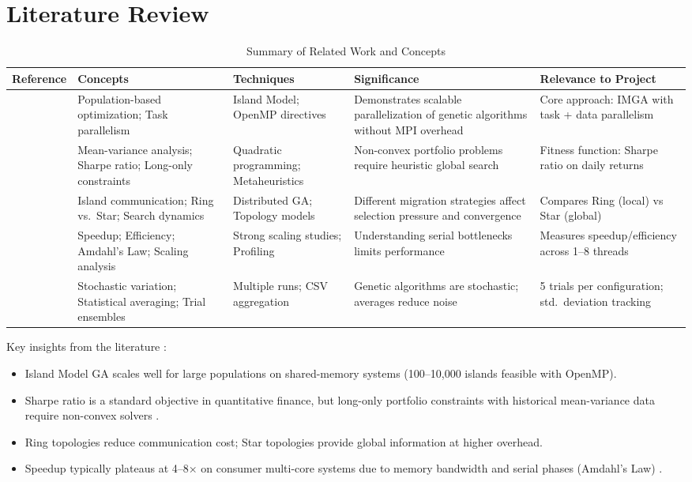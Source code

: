 \documentclass[12pt,a4paper]{article}
\begin{document}
\newpage
\section{Literature Review}

\begin{longtable}[htp]{|p{1.8cm}|p{2.2cm}|p{2.2cm}|p{2.8cm}|p{3cm}|}
\caption{Summary of Related Work and Concepts}
\label{Table:LitReview}
\hline \textbf{Reference} & \textbf{Concepts} & \textbf{Techniques} & \textbf{Significance} & \textbf{Relevance to Project} \\
\hline \multirow{2}{*}{\cite{alba2005}} & Population-based optimization; Task parallelism & Island Model; OpenMP directives & Demonstrates scalable parallelization of genetic algorithms without MPI overhead & Core approach: IMGA with task + data parallelism \\
\hline \multirow{2}{*}{\cite{cantu2015genetic}} & Mean-variance analysis; Sharpe ratio; Long-only constraints & Quadratic programming; Metaheuristics & Non-convex portfolio problems require heuristic global search & Fitness function: Sharpe ratio on daily returns \\
\hline \multirow{2}{*}{\cite{branke2003parallel}} & Island communication; Ring vs.~Star; Search dynamics & Distributed GA; Topology models & Different migration strategies affect selection pressure and convergence & Compares Ring (local) vs Star (global) \\
\hline \multirow{2}{*}{\cite{amdahl1967validity}} & Speedup; Efficiency; Amdahl's Law; Scaling analysis & Strong scaling studies; Profiling & Understanding serial bottlenecks limits performance & Measures speedup/efficiency across 1--8 threads \\
\hline \multirow{2}{*}{\cite{whitley1988genitor}} & Stochastic variation; Statistical averaging; Trial ensembles & Multiple runs; CSV aggregation & Genetic algorithms are stochastic; averages reduce noise & 5 trials per configuration; std.~deviation tracking \\
\hline
\end{longtable}

Key insights from the literature \cite{chapman2007using}:
\begin{itemize}
	\item Island Model GA scales well for large populations on shared-memory systems (100--10,000 islands feasible with OpenMP).
	\item Sharpe ratio is a standard objective in quantitative finance, but long-only portfolio constraints with historical mean-variance data require non-convex solvers \cite{cantu2015genetic}.
	\item Ring topologies reduce communication cost; Star topologies provide global information at higher overhead.
	\item Speedup typically plateaus at 4--8× on consumer multi-core systems due to memory bandwidth and serial phases (Amdahl's Law) \cite{amdahl1967validity}.
\end{itemize}
\end{document}
